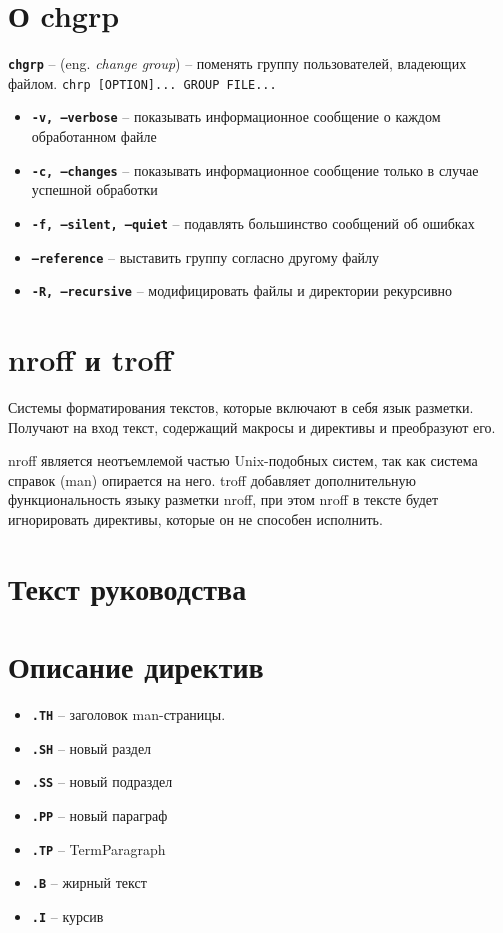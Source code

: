 \documentclass[12pt, a4paper]{article}
\begin{document}


\section{О chgrp}
\textbf{\texttt{chgrp}} -- (eng. \textit{change group}) -- поменять
    группу пользователей, владеющих файлом. \texttt{chrp [OPTION]... GROUP FILE...}
\begin{itemize}
    \item \textbf{\texttt{-v, --verbose}} -- показывать информационное сообщение
      о каждом обработанном файле
    \item \textbf{\texttt{-c, --changes}} -- показывать информационное сообщение
      только в случае успешной обработки
    \item \textbf{\texttt{-f, --silent, --quiet}} -- подавлять большинство
      сообщений об ошибках
    \item \textbf{\texttt{--reference}} -- выставить группу
      согласно другому файлу
    \item \textbf{\texttt{-R, --recursive}} -- модифицировать файлы и директории
      рекурсивно
\end{itemize}

\section{nroff и troff}
Системы форматирования текстов, которые включают в себя язык разметки. Получают
на вход текст, содержащий макросы и директивы и преобразуют его.

nroff является неотъемлемой частью Unix-подобных систем, так как система справок
(man) опирается на него. troff добавляет дополнительную функциональность языку
разметки nroff, при этом nroff в тексте будет игнорировать директивы, которые
он не способен исполнить.

\section{Текст руководства}
{\scriptsize }

\section{Описание директив}
\begin{itemize}
  \item \textbf{\texttt{.TH}} -- заголовок man-страницы.
  \item \textbf{\texttt{.SH}} -- новый раздел
  \item \textbf{\texttt{.SS}} -- новый подраздел
  \item \textbf{\texttt{.PP}} -- новый параграф
  \item \textbf{\texttt{.TP}} -- TermParagraph
  \item \textbf{\texttt{.B}} -- жирный текст
  \item \textbf{\texttt{.I}} -- курсив
\end{itemize}
\end{document}
